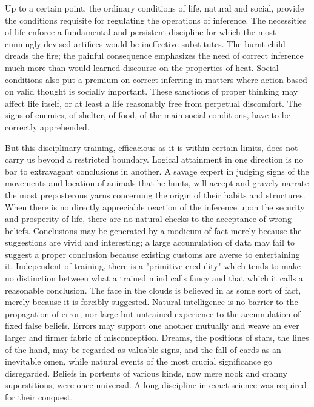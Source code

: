\documentclass[letterpaper]{book}
\begin{document}

Up to a certain point, the ordinary conditions of life, natural and
social, provide the conditions requisite for regulating the operations
of inference. The necessities of life enforce a fundamental and
persistent discipline for which the most cunningly devised artifices
would be ineffective substitutes. The burnt child dreads the fire; the
painful consequence emphasizes the need of correct inference much more
than would learned discourse on the properties of heat. Social
conditions also put a premium on correct inferring in matters where
action based on valid thought is socially important. These sanctions of
proper thinking may affect life itself, or at least a life reasonably
free from perpetual discomfort. The signs of enemies, of shelter, of
food, of the main social conditions, have to be correctly apprehended.


But this disciplinary training, efficacious as it is within certain
limits, does not carry us beyond a restricted boundary. Logical
attainment in one direction is no bar to extravagant conclusions in
another. A savage expert in judging signs of the movements and location
of animals that he hunts, will accept and gravely narrate the most
preposterous yarns concerning the origin of their habits and structures.
When there is no directly appreciable reaction of the inference upon the
security and prosperity of life, there are no natural checks to the
acceptance of wrong beliefs. Conclusions may be generated by a modicum
of fact merely because the suggestions are vivid and interesting; a
large accumulation of data may fail to suggest a proper conclusion
because existing customs are averse to entertaining it. Independent of
training, there is a "primitive
credulity"
which tends to make no distinction between what a trained mind calls
fancy and that which it calls a reasonable conclusion. The face in the
clouds is believed in as some sort of fact, merely because it is
forcibly suggested. Natural intelligence is no barrier to the
propagation of error, nor large but untrained experience to the
accumulation of fixed false beliefs. Errors may support one another
mutually and weave an ever larger and firmer fabric of misconception.
Dreams, the positions of stars, the lines of the hand, may be regarded
as valuable signs, and the fall of cards as an inevitable omen, while
natural events of the most crucial significance go disregarded. Beliefs
in portents of various kinds, now mere nook and cranny superstitions,
were once universal. A long discipline in exact science was required for
their conquest.
\end{document}

